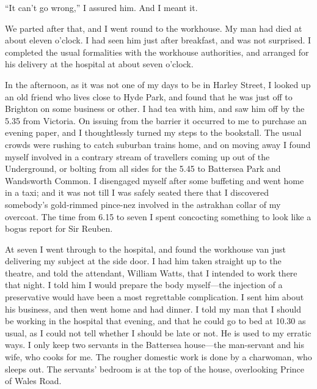 \enquote{It can’t go wrong,} I assured him. And I meant it.

We parted after that, and I went round to the workhouse. My man had died at about eleven o’clock. I had seen him just after breakfast, and was not surprised. I completed the usual formalities with the workhouse authorities, and arranged for his delivery at the hospital at about seven o’clock.

In the afternoon, as it was not one of my days to be in Harley Street, I looked up an old friend who lives close to Hyde Park, and found that he was just off to Brighton on some business or other. I had tea with him, and saw him off by the 5.35 from Victoria. On issuing from the barrier it occurred to me to purchase an evening paper, and I thoughtlessly turned my steps to the bookstall. The usual crowds were rushing to catch suburban trains home, and on moving away I found myself involved in a contrary stream of travellers coming up out of the Underground, or bolting from all sides for the 5.45 to Battersea Park and Wandsworth Common. I disengaged myself after some buffeting and went home in a taxi; and it was not till I was safely seated there that I discovered somebody’s gold-rimmed pince-nez involved in the astrakhan collar of my overcoat. The time from 6.15 to seven I spent concocting something to look like a bogus report for Sir Reuben.

At seven I went through to the hospital, and found the workhouse van just delivering my subject at the side door. I had him taken straight up to the theatre, and told the attendant, William Watts, that I intended to work there that night. I told him I would prepare the body myself\allowbreak---\allowbreak the injection of a preservative would have been a most regrettable complication. I sent him about his business, and then went home and had dinner. I told my man that I should be working in the hospital that evening, and that he could go to bed at 10.30 as usual, as I could not tell whether I should be late or not. He is used to my erratic ways. I only keep two servants in the Battersea house\allowbreak---\allowbreak the man-servant and his wife, who cooks for me. The rougher domestic work is done by a charwoman, who sleeps out. The servants’ bedroom is at the top of the house, overlooking Prince of Wales Road.

